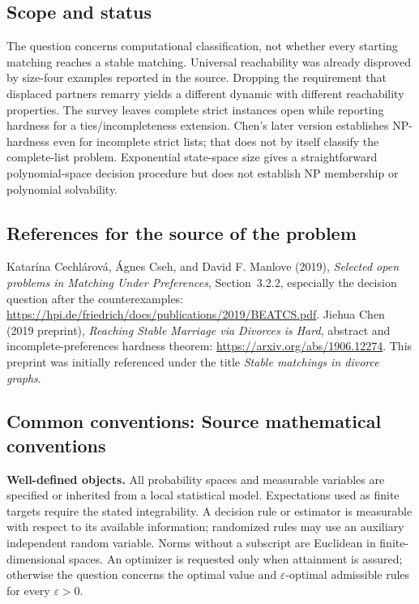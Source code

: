 \documentclass[11pt,a4paper]{article}
\begin{document}
\subsection*{Scope and status}
The question concerns computational classification, not whether every starting matching reaches a stable matching. Universal reachability was already disproved by size-four examples reported in the source. Dropping the requirement that displaced partners remarry yields a different dynamic with different reachability properties. The survey leaves complete strict instances open while reporting hardness for a ties/incompleteness extension. Chen's later version establishes NP-hardness even for incomplete strict lists; that does not by itself classify the complete-list problem. Exponential state-space size gives a straightforward polynomial-space decision procedure but does not establish NP membership or polynomial solvability.
\subsection*{References for the source of the problem}
Katar\'ina Cechl\'arov\'a, \'Agnes Cseh, and David F. Manlove (2019), \emph{Selected open problems in Matching Under Preferences}, Section~3.2.2, especially the decision question after the counterexamples: \url{https://hpi.de/friedrich/docs/publications/2019/BEATCS.pdf}. Jiehua Chen (2019 preprint), \emph{Reaching Stable Marriage via Divorces is Hard}, abstract and incomplete-preferences hardness theorem: \url{https://arxiv.org/abs/1906.12274}. This preprint was initially referenced under the title \emph{Stable matchings in divorce graphs}.

\subsection*{Common conventions: Source mathematical conventions}

\textbf{Well-defined objects.}
All probability spaces and measurable variables are specified or inherited
from a local statistical model. Expectations used as finite targets require
the stated integrability. A decision rule or estimator is measurable with
respect to its available information; randomized rules may use an auxiliary
independent random variable. Norms without a subscript are Euclidean in
finite-dimensional spaces. An optimizer is requested only when attainment
is assured; otherwise the question concerns the optimal value and
$\varepsilon$-optimal admissible rules for every $\varepsilon>0$.
\end{document}
